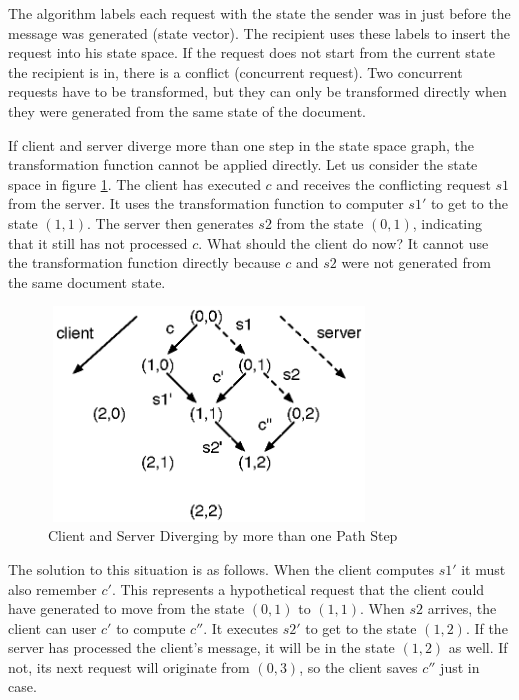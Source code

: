 The algorithm labels each request with the state the sender was in just before the message was generated (state vector). The recipient uses these labels to insert the request into his state space. If the request does not start from the current state the recipient is in, there is a conflict (concurrent request). Two concurrent requests have to be transformed, but they can only be transformed directly when they were generated from the same state of the document.

If client and server diverge more than one step in the state space graph, the transformation function cannot be applied directly. Let us consider the state space in figure \ref{fig:concepts.statespace2}. The client has executed $c$ and receives the conflicting request $s1$ from the server. It uses the transformation function to computer $s1'$ to get to the state $(1,1)$. The server then generates $s2$ from the state $(0,1)$, indicating that it still has not processed $c$. What should the client do now? It cannot use the transformation function directly because $c$ and $s2$ were not generated from the same document state.

\begin{figure}[htb]
 \centering
 \includegraphics[width=8.5cm,height=5.7cm]{../../images/concepts_statespace2.eps}
 \caption{Client and Server Diverging by more than one Path Step}
 \label{fig:concepts.statespace2}
\end{figure}

The solution to this situation is as follows. When the client computes $s1'$ it must also remember $c'$. This represents a hypothetical request that the client could have generated to move from the state $(0,1)$ to $(1,1)$. When $s2$ arrives, the client can user $c'$ to compute $c''$. It executes $s2'$ to get to the state $(1,2)$. If the server has processed the client's message, it will be in the state $(1,2)$ as well. If not, its next request will originate from $(0,3)$, so the client saves $c''$ just in case.

